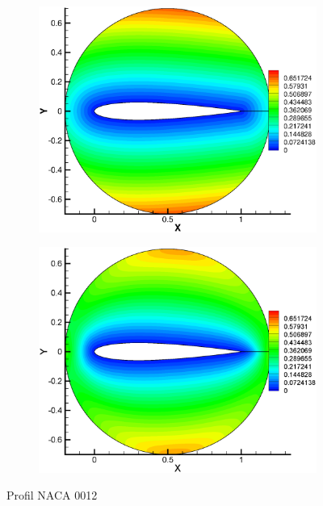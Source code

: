 \begin{figure}[h]	
    \begin{subfigure}[h]{\textwidth}
    	\centering
    	\includegraphics[trim = 22mm 10mm 10mm 20mm, width=0.9\linewidth]{Rysunki/NACA_0012_profil_brute.eps}
	\end{subfigure}    
	\begin{subfigure}[h]{\textwidth}
		\centering
    	\includegraphics[trim = 22mm 10mm 10mm 20mm, width=0.9\linewidth]{Rysunki/NACA_0012_profil_poisson.eps}      	
	\end{subfigure}
	\caption{Profil NACA 0012}
\end{figure}


